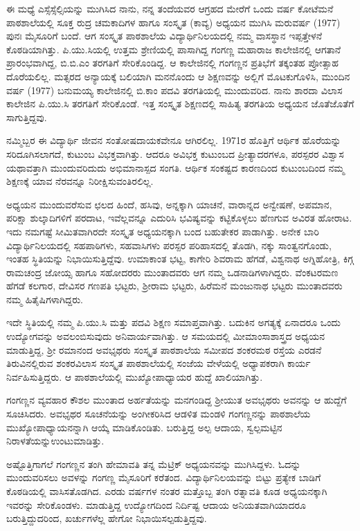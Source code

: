 {ಈ ಮಧ್ಯೆ ಎಸ್ಸೆಸ್ಸೆಲ್ಸಿಯನ್ನು ಮುಗಿಸಿದ ನಾನು, ನನ್ನ ತಂದೆಯವರ ಆಗ್ರಹದ ಮೇರೆಗೆ ಒಂದು ವರ್ಷ ಕೋಟೆಮನೆ ಪಾಠಶಾಲೆಯಲ್ಲಿ ಸೂಕ್ತ  \enginline{-}  ರುದ್ರ  \enginline{-}  ಚಮಕಾದಿಗಳ ಹಾಗೂ ಸಂಸ್ಕೃತ (ಕಾವ್ಯ) ಅಧ್ಯಯನ ಮುಗಿಸಿ ಮರುವರ್ಷ (1977) ಪುನಃ ಮೈಸೂರಿಗೆ ಬಂದೆ. ಆಗ ಸಂಸ್ಕೃತ ಪಾಠಶಾಲೆಯ ವಿದ್ಯಾರ್ಥಿನಿಲಯದಲ್ಲಿ ನಮ್ಮ ವಾಸಸ್ಥಾನ ಇಪ್ಪತ್ತೇಳನೆ ಕೊಠಡಿಯಾಗಿತ್ತು. ಪಿ.ಯು.ಸಿಯಲ್ಲಿ ಉತ್ತಮ ಶ್ರೇಣಿಯಲ್ಲಿ ಪಾಸಾಗಿದ್ದ ಗಂಗಣ್ಣ ಮಹಾರಾಜ ಕಾಲೇಜಿನಲ್ಲಿ ಆಗತಾನೆ ಪ್ರಾರಂಭವಾಗಿದ್ದ, ಬಿ.ಬಿ.ಎಂ ತರಗತಿಗೆ ಸೇರಿಕೊಂಡಿದ್ದ. ಆ ಕಾಲೇಜಿನಲ್ಲಿ ಗಂಗಣ್ಣನ ಪ್ರತಿಭೆಗೆ ತಕ್ಕಂತಹ ಪ್ರೋತ್ಸಾಹ ದೊರೆಯಲಿಲ್ಲ. ಮತ್ಸರದ ಅನ್ಯಾಯಕ್ಕೆ ಬಲಿಯಾಗಿ ಮನನೊಂದು ಆ ಶಿಕ್ಷಣವನ್ನು ಅಲ್ಲಿಗೆ ಮೊಟಕು\-ಗೊಳಿಸಿ, ಮುಂದಿನ ವರ್ಷ (1977) ಬನುಮಯ್ಯ ಕಾಲೇಜಿನಲ್ಲಿ ಬಿ.ಕಾಂ ಪದವಿ ತರಗತಿಯಲ್ಲಿ ಮುಂದುವರಿದ. ನಾನು ಶಾರದಾ ವಿಲಾಸ ಕಾಲೇಜಿನ ಪಿ.ಯು.ಸಿ ತರಗತಿಗೆ ಸೇರಿಕೊಂಡೆ. ಇತ್ತ ಸಂಸ್ಕೃತ ಶಿಕ್ಷಣದಲ್ಲಿ ಸಾಹಿತ್ಯ ತರಗತಿಯ ಅಧ್ಯಯನ ಜೊತೆಜೊತೆಗೆ ಸಾಗುತ್ತಿದ್ದವು. 

ನಮ್ಮಿಬ್ಬರ ಈ ವಿದ್ಯಾರ್ಥಿ ಜೀವನ ಸಂತೋಷದಾಯಕವೇನೂ ಆಗಿರಲಿಲ್ಲ. 1971ರ ಹೊತ್ತಿಗೆ ಆರ್ಥಿಕ ಹೊರೆಯನ್ನು ಸರಿದೂಗಿಸಲಾಗದೆ, ಕುಟುಂಬ	ವಿಭಕ್ತವಾಗಿತ್ತು. ಆದರೂ ಅವಿಭಕ್ತ ಕುಟುಂಬದ ಪ್ರೀತ್ಯಾದರಗಳೂ, ಪರಸ್ಪರರ ವಿಶ್ವಾಸ ಯಥಾವತ್ತಾಗಿ ಮುಂದುವರಿದುದು ಅಭಿಮಾನಾಸ್ಪದ ಸಂಗತಿ. ಆರ್ಥಿಕ ಸಂಕಷ್ಟದ ಕಾರಣದಿಂದ ಕುಟುಂಬದಿಂದ ನಮ್ಮ ಶಿಕ್ಷಣಕ್ಕೆ ಯಾವ ನೆರವನ್ನೂ ನಿರೀಕ್ಷಿಸುವಂತಿರಲಿಲ್ಲ.

ಅಧ್ಯಯನ ಮುಂದುವರೆಸುವ ಛಲದ ಹಿಂದೆ, ಹಸಿವು, ಅನ್ನಕ್ಕಾಗಿ ಯಾಚನೆ, ವಾರಾನ್ನದ ಅನ್ವೇಷಣೆ, ಅಪಮಾನ, ಪರಿಕ್ಷಾ ಶುಲ್ಕಾದಿಗಳಿಗೆ ಪರದಾಟ, ಇವೆಲ್ಲವನ್ನೂ ಎದುರಿಸಿ ಭವಿಷ್ಯವನ್ನು ಕಟ್ಟಿಕೊಳ್ಳಲು ಹೆಣಗುವ ಅವಿರತ ಹೋರಾಟ. ಇದು ನಮಗಷ್ಟೆ ಸೀಮಿತವಾಗಿರದೇ ಸಂಸ್ಕೃತ ಅಧ್ಯಯನಕ್ಕಾಗಿ ಬಂದ ಬಹುತೇಕರ ಪಾಡಾಗಿತ್ತು. ಅನೇಕ ಬಾರಿ ವಿದ್ಯಾರ್ಥಿನಿಲಯದಲ್ಲಿ ಸಹಪಾಠಿಗಳು, ಸಹವಾಸಿಗಳು ಪರಸ್ಪರ ಪರಿಹಾಸದಲ್ಲಿ ತೊಡಗಿ, ನಕ್ಕು ಸಾಂತ್ವನಗೊಂಡು, ಇಂತಹ ಸ್ಥಿತಿಯನ್ನು ನಿಭಾಯಿಸುತ್ತಿದ್ದೆವು. ಉಮಾಕಾಂತ ಭಟ್ಟ, ಕಾಗೇರಿ ಶಿವರಾಮ ಹೆಗಡೆ, ವಿಶ್ವನಾಥ ಅಗ್ನಿಹೋತ್ರಿ, ಕಿಗ್ಗ ರಾಮಚಂದ್ರ ಜೋಯ್ಸ ಹಾಗೂ ಸಹೋದರರು ಮುಂತಾದವರು ಆಗ ನಮ್ಮ ಒಡನಾಡಿಗಳಾಗಿದ್ದರು. ವೆಂಕಟರಮಣ ಹೆಗಡೆ ಕಲಗಾರ, ದೇವಿಸರ ಗಣಪತಿ ಭಟ್ಟರು, ಶ್ರೀರಾಮ ಭಟ್ಟರು, ಹಿರೆಮನೆ ಮಂಜುನಾಥ ಭಟ್ಟರು ಮುಂತಾದವರು ನಮ್ಮ ಹಿತೈಷಿಗಳಾಗಿದ್ದರು.

ಇದೇ ಸ್ಥಿತಿಯಲ್ಲಿ ನಮ್ಮ ಪಿ.ಯು.ಸಿ ಮತ್ತು ಪದವಿ ಶಿಕ್ಷಣ ಸಮಾಪ್ತವಾಗಿತ್ತು. ಬದುಕಿನ ಅಗತ್ಯಕ್ಕೆ ಏನಾದರೂ ಒಂದು  ಉದ್ಯೋಗವನ್ನು ಅವಲಂಬಿಸುವುದು ಅನಿವಾರ್ಯವಾಗಿತ್ತು. ಆ ಸಮಯದಲ್ಲಿ ಮೀಮಾಂಸಾಶಾಸ್ತ್ರದ ಅಧ್ಯಯನ ಮಾಡುತ್ತಿದ್ದ, ಶ್ರೀ ರಮಾನಂದ ಅವಭೃಥರು ಸಂಸ್ಕೃತ ಪಾಠಶಾಲೆಯ ಸಮೀಪದ ಶಂಕರಮಠ ರಸ್ತೆಯ ಎರಡನೆ ತಿರುವಿನಲ್ಲಿರುವ ಶಂಕರವಿಲಾಸ ಸಂಸ್ಕೃತ ಪಾಠಶಾಲೆಯಲ್ಲಿ ಸಂಜೆಯ ವೇಳೆಯಲ್ಲಿ ಅಧ್ಯಾಪಕರಾಗಿ ಕಾರ್ಯ ನಿರ್ವಹಿಸುತ್ತಿದ್ದರು. ಆ ಪಾಠಶಾಲೆಯಲ್ಲಿ ಮುಖ್ಯೋಪಾಧ್ಯಾಯರ ಹುದ್ದೆ ಖಾಲಿಯಾಗಿತ್ತು. 

ಗಂಗಣ್ಣನ ವ್ಯವಹಾರ ಕೌಶಲ ಮುಂತಾದ ಅರ್ಹತೆಯನ್ನು ಮನಗಂಡಿದ್ದ ಶ್ರೀಯುತ ಅವಭೃಥರು ಅವನನ್ನು ಆ ಹುದ್ದೆಗೆ ಸೂಚಿಸಿದರು. ಅವಭೃಥರ ಸೂಚನೆಯನ್ನು ಅಂಗೀಕರಿಸಿದ ಆಡಳಿತ ಮಂಡಳಿ ಗಂಗಣ್ಣನನ್ನು ಪಾಠಶಾಲೆಯ ಮುಖ್ಯೋಪಾಧ್ಯಾಯನನ್ನಾಗಿ ಆಯ್ಕೆ ಮಾಡಿಕೊಂಡಿತು. ಬರುತ್ತಿದ್ದ ಅಲ್ಪ ಆದಾಯ, ಸ್ವಲ್ಪಮಟ್ಟಿನ ನಿರಾಳತೆಯನ್ನು\break ಉಂಟುಮಾಡಿತ್ತು.
\vskip 3pt

ಅಷ್ಟೊತ್ತಿಗಾಗಲೆ ಗಂಗಣ್ಣನ ತಂಗಿ ಹೇಮಾವತಿ ತನ್ನ ಮೆಟ್ರಿಕ್ ಅಧ್ಯಯನವನ್ನು ಮುಗಿಸಿದ್ದಳು. ಓದನ್ನು ಮುಂದುವರಿಸಲು  ಅವಳನ್ನು ಗಂಗಣ್ಣ ಮೈಸೂರಿಗೆ ಕರೆತಂದ. ವಿದ್ಯಾರ್ಥಿನಿಲಯವನ್ನು ಬಿಟ್ಟು ಪ್ರತ್ಯೇಕ ಬಾಡಿಗೆ ಕೊಠಡಿಯಲ್ಲಿ ವಾಸಿಸತೊಡಗಿದ. ಎರಡು ವರ್ಷಗಳ ನಂತರ ಮತ್ತೊಬ್ಬ ತಂಗಿ ರತ್ನಾವತಿ ಕೂಡ ಅಧ್ಯಯನಕ್ಕಾಗಿ ಇವರನ್ನು ಸೇರಿಕೊಂಡಳು. ಮಾಡುತ್ತಿದ್ದ ಉದ್ಯೋಗದಿಂದ ನಿರ್ದಿಷ್ಟ ಆದಾಯ ಅನಿಯತವಾಗಿಯಾದರೂ ಬರುತ್ತಿದ್ದುದರಿಂದ, ಖರ್ಚುಗಳೆಲ್ಲ ಹೇಗೋ ನಿಭಾಯಿಸಲ್ಪಡುತ್ತಿದ್ದವು.
\vskip 3pt

}
